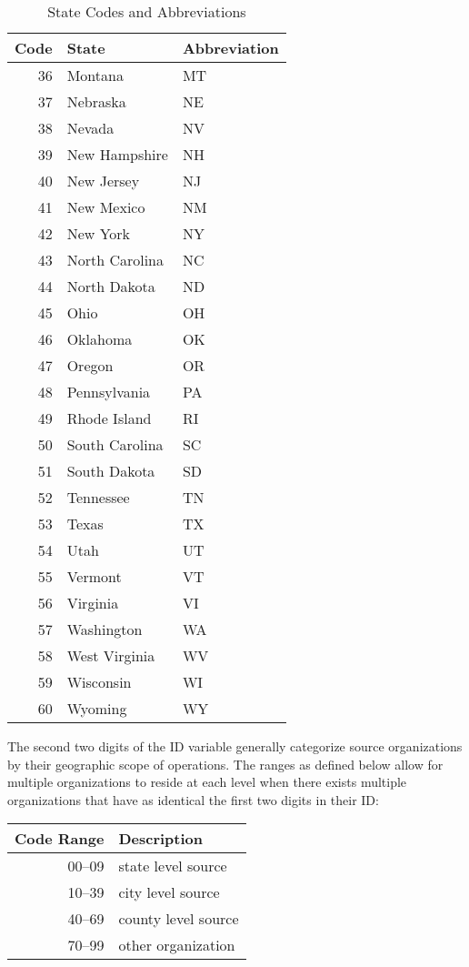 \documentclass[11pt]{article}
\begin{document}
\begin{table}[H]
\begin{center}
\begin{tabular}{rll}
\toprule
\textbf{Code} & \textbf{State} & \textbf{Abbreviation} \\
\midrule
36 & Montana & MT \\
37 & Nebraska & NE \\
38 & Nevada & NV \\
39 & New Hampshire & NH \\
40 & New Jersey & NJ \\
41 & New Mexico & NM \\
42 & New York & NY \\
43 & North Carolina & NC \\
44 & North Dakota & ND \\
45 & Ohio & OH \\
46 & Oklahoma & OK \\
47 & Oregon & OR \\
48 & Pennsylvania & PA \\
49 & Rhode Island & RI \\
50 & South Carolina & SC \\
51 & South Dakota & SD \\
52 & Tennessee & TN \\
53 & Texas & TX \\
54 & Utah & UT \\
55 & Vermont & VT \\
56 & Virginia & VI \\
57 & Washington & WA \\
58 & West Virginia & WV \\
59 & Wisconsin & WI \\
60 & Wyoming & WY\\
\bottomrule
\end{tabular}
\caption{\label{t.state.codes.2}State Codes and Abbreviations}
\end{center}
\end{table}

The second two digits of the ID variable generally categorize source organizations by their geographic scope of operations.  The ranges as defined below allow for multiple organizations to reside at each level when there exists multiple organizations that have as identical the first two digits in their ID:

\begin{table}[H]
\begin{center}
\begin{tabular}{rl}
\toprule
\textbf{Code Range} & \textbf{Description} \\
\midrule
00--09 & state level source\\
10--39 & city level source\\
40--69 & county level source\\
70--99 & other organization\\
\bottomrule
\end{tabular}
\end{center}
\end{table} 
\end{document}
